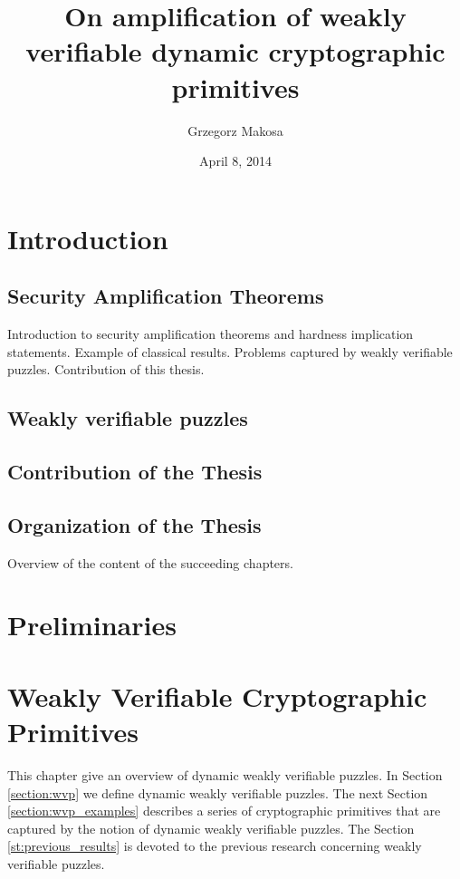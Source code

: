 \documentclass[11pt,a4paper,titlepage]{memoir}
\title{On amplification of weakly verifiable dynamic cryptographic primitives}
\author{Grzegorz Makosa}
\date{April 8, 2014}
\begin{document}
\frontmatter

%

\cleartorecto
\tableofcontents
\mainmatter

\chapter{Introduction}
\section{Security Amplification Theorems}
Introduction to security amplification theorems and hardness implication statements.
Example of classical results. Problems captured by weakly verifiable puzzles.
Contribution of this thesis.
\section{Weakly verifiable puzzles}
\section{Contribution of the Thesis}
\section{Organization of the Thesis}
Overview of the content of the succeeding chapters.

\chapter{Preliminaries}


\chapter{Weakly Verifiable Cryptographic Primitives}
This chapter give an overview of dynamic weakly verifiable puzzles.
In Section \ref{section:wvp} we define dynamic weakly verifiable puzzles.
The next Section \ref{section:wvp_examples} describes a series of cryptographic primitives that are captured by the notion of dynamic weakly verifiable puzzles.
The Section \ref{st:previous_results} is devoted to the previous research concerning weakly verifiable puzzles.
\end{document}
